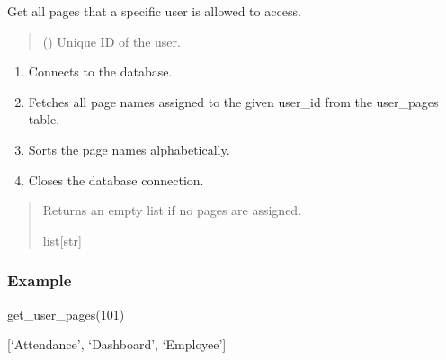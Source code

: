 \documentclass[letterpaper,10pt,english]{sphinxmanual}
\begin{document}
\begin{fulllineitems}
\label{\detokenize{modules:app.access.get_user_pages}}
\pysigstartsignatures
\pysiglinewithargsret
{}
{}
{}
\pysigstopsignatures
\sphinxAtStartPar
Get all pages that a specific user is allowed to access.
\begin{quote}\begin{description}
\sphinxAtStartPar
{} () \textendash{} Unique ID of the user.

\end{description}\end{quote}
\begin{description}
\begin{enumerate}
%
\item {} 
\sphinxAtStartPar
Connects to the database.

\item {} 
\sphinxAtStartPar
Fetches all page names assigned to the given user\_id
from the user\_pages table.

\item {} 
\sphinxAtStartPar
Sorts the page names alphabetically.

\item {} 
\sphinxAtStartPar
Closes the database connection.

\end{enumerate}

\end{description}
\begin{quote}\begin{description}
\sphinxAtStartPar
\begin{description}
\sphinxAtStartPar
Returns an empty list if no pages are assigned.

\end{description}


\sphinxAtStartPar
list{[}str{]}

\end{description}\end{quote}
\subsubsection*{Example}
\begin{description}
\sphinxAtStartPar
get\_user\_pages(101)

\sphinxAtStartPar
{[}‘Attendance’, ‘Dashboard’, ‘Employee’{]}

\end{description}

\end{fulllineitems}
\end{document}
